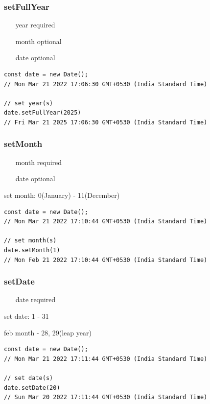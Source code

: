 \documentclass[10pt]{article}
\begin{document}
\subsubsection{setFullYear}
\begin{itemize}
\color{red}
\item[year] required
\color{forestgreen}
\item[month] optional

\item[date] optional
\end{itemize}
\begin{lstlisting}[style=ES6, caption={Date methods - full year}]
const date = new Date();
// Mon Mar 21 2022 17:06:30 GMT+0530 (India Standard Time)

// set year(s)
date.setFullYear(2025)
// Fri Mar 21 2025 17:06:30 GMT+0530 (India Standard Time)
\end{lstlisting}

\subsubsection{setMonth}
\begin{itemize}
\color{red}
\item[month] required
\color{forestgreen}

\item[date] optional
\end{itemize}

set month: 0(January) - 11(December)

\begin{lstlisting}[style=ES6, caption={Date methods - month(s)}]
const date = new Date();
// Mon Mar 21 2022 17:10:44 GMT+0530 (India Standard Time)

// set month(s)
date.setMonth(1)
// Mon Feb 21 2022 17:10:44 GMT+0530 (India Standard Time)
\end{lstlisting}

\subsubsection{setDate}
\begin{itemize}
\color{red}
\item[date] required
\end{itemize}

set date: 1 - 31

feb month - 28, 29(leap year)

\begin{lstlisting}[style=ES6, caption={Date methods - date(s)}]
const date = new Date();
// Mon Mar 21 2022 17:11:44 GMT+0530 (India Standard Time)

// set date(s)
date.setDate(20)
// Sun Mar 20 2022 17:11:44 GMT+0530 (India Standard Time)
\end{lstlisting}
\end{document}
